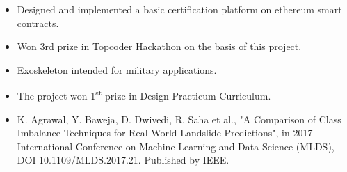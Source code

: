 \begin{itemize}
    \item Designed and implemented a basic certification platform on ethereum smart contracts.
    \item Won 3rd prize in Topcoder Hackathon on the basis of this project.
\end{itemize}
\smallskip

\begin{itemize}
\item Exoskeleton intended for military applications.
\item The project won 1\textsuperscript{st} prize in Design Practicum Curriculum.
\end{itemize}
\smallskip




\smallskip
\begin{itemize}
\item K. Agrawal, Y. Baweja, D. Dwivedi, R. Saha et al., "A Comparison of Class Imbalance Techniques for Real-World Landslide Predictions", in 2017 International Conference on Machine Learning and Data Science (MLDS), DOI 10.1109/MLDS.2017.21. Published by IEEE.
\end{itemize}
